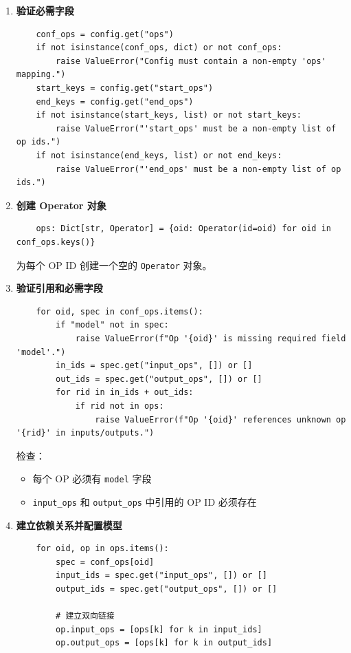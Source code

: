 \documentclass[12pt,a4paper]{article}
\begin{document}
\begin{enumerate}
    \item \textbf{验证必需字段}
    \begin{lstlisting}
    conf_ops = config.get("ops")
    if not isinstance(conf_ops, dict) or not conf_ops:
        raise ValueError("Config must contain a non-empty 'ops' mapping.")
    start_keys = config.get("start_ops")
    end_keys = config.get("end_ops")
    if not isinstance(start_keys, list) or not start_keys:
        raise ValueError("'start_ops' must be a non-empty list of op ids.")
    if not isinstance(end_keys, list) or not end_keys:
        raise ValueError("'end_ops' must be a non-empty list of op ids.")
    \end{lstlisting}
    
    \item \textbf{创建 Operator 对象}
    \begin{lstlisting}
    ops: Dict[str, Operator] = {oid: Operator(id=oid) for oid in conf_ops.keys()}
    \end{lstlisting}
    为每个 OP ID 创建一个空的 \texttt{Operator} 对象。
    
    \item \textbf{验证引用和必需字段}
    \begin{lstlisting}
    for oid, spec in conf_ops.items():
        if "model" not in spec:
            raise ValueError(f"Op '{oid}' is missing required field 'model'.")
        in_ids = spec.get("input_ops", []) or []
        out_ids = spec.get("output_ops", []) or []
        for rid in in_ids + out_ids:
            if rid not in ops:
                raise ValueError(f"Op '{oid}' references unknown op '{rid}' in inputs/outputs.")
    \end{lstlisting}
    检查：
    \begin{itemize}
        \item 每个 OP 必须有 \texttt{model} 字段
        \item \texttt{input_ops} 和 \texttt{output_ops} 中引用的 OP ID 必须存在
    \end{itemize}
    
    \item \textbf{建立依赖关系并配置模型}
    \begin{lstlisting}
    for oid, op in ops.items():
        spec = conf_ops[oid]
        input_ids = spec.get("input_ops", []) or []
        output_ids = spec.get("output_ops", []) or []
        
        # 建立双向链接
        op.input_ops = [ops[k] for k in input_ids]
        op.output_ops = [ops[k] for k in output_ids]
        

\end{lstlisting}
\end{enumerate}
\end{document}
